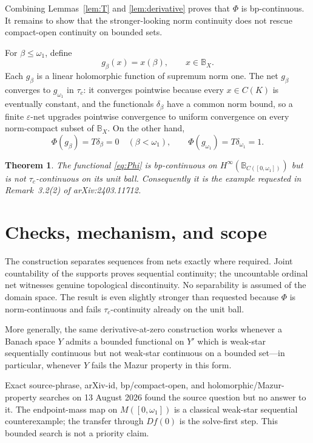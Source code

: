 \documentclass[10pt]{article}
\newtheorem{theorem}{Theorem}
\newcommand{\tc}{\tau_c}
\newcommand{\B}{\mathbb B}
\newcommand{\Hin}{H^\infty}
\begin{document}
Combining Lemmas~\ref{lem:T} and \ref{lem:derivative} proves that $\Phi$
is bp-continuous.  It remains to show that the stronger-looking norm
continuity does not rescue compact-open continuity on bounded sets.

For $\beta\leq\omega_1$, define
\[
 g_\beta(x)=x(\beta),\qquad x\in\B_X.
\]
Each $g_\beta$ is a linear holomorphic function of supremum norm one.  The
net $g_\beta$ converges to $g_{\omega_1}$ in $\tc$: it converges pointwise
because every $x\in C(K)$ is eventually constant, and the functionals
$\delta_\beta$ have a common norm bound, so a finite $\varepsilon$-net
upgrades pointwise convergence to uniform convergence on every norm-compact
subset of $\B_X$.  On the other hand,
\[
 \Phi(g_\beta)=T\delta_\beta=0\quad(\beta<\omega_1),
 \qquad
 \Phi(g_{\omega_1})=T\delta_{\omega_1}=1.
\]

\begin{theorem}\label{thm:main}
The functional \eqref{eq:Phi} is bp-continuous on
$\Hin(\B_{C([0,\omega_1])})$ but is not $\tc$-continuous on its unit ball.
Consequently it is the example requested in Remark~3.2(2) of
arXiv:2403.11712.
\end{theorem}

\section{Checks, mechanism, and scope}

The construction separates sequences from nets exactly where required.
Joint countability of the supports proves sequential continuity; the
uncountable ordinal net witnesses genuine topological discontinuity.  No
separability is assumed of the domain space.  The result is even slightly
stronger than requested because $\Phi$ is norm-continuous and fails
$\tc$-continuity already on the unit ball.

More generally, the same derivative-at-zero construction works whenever a
Banach space $Y$ admits a bounded functional on $Y'$ which is weak-star
sequentially continuous but not weak-star continuous on a bounded set---in
particular, whenever $Y$ fails the Mazur property in this form.

Exact source-phrase, arXiv-id, bp/compact-open, and holomorphic/Mazur-property
searches on 13 August 2026 found the source question but no answer to it.
The endpoint-mass map on $M([0,\omega_1])$ is a classical weak-star
sequential counterexample; the transfer through $Df(0)$ is the solve-first
step.  This bounded search is not a priority claim.
\end{document}
